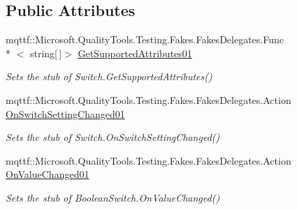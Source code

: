 \subsection*{Public Attributes}
\begin{DoxyCompactItemize}
\item 
mqttf\-::\-Microsoft.\-Quality\-Tools.\-Testing.\-Fakes.\-Fakes\-Delegates.\-Func\\*
$<$ string\mbox{[}$\,$\mbox{]}$>$ \hyperlink{class_system_1_1_diagnostics_1_1_fakes_1_1_stub_boolean_switch_a366e00de589c7eb21b99a2d8ec1f78e2}{Get\-Supported\-Attributes01}
\begin{DoxyCompactList}\small\item\em Sets the stub of Switch.\-Get\-Supported\-Attributes()\end{DoxyCompactList}\item 
mqttf\-::\-Microsoft.\-Quality\-Tools.\-Testing.\-Fakes.\-Fakes\-Delegates.\-Action \hyperlink{class_system_1_1_diagnostics_1_1_fakes_1_1_stub_boolean_switch_a458bb50dd8bf0336d5cc6a363cf26b2a}{On\-Switch\-Setting\-Changed01}
\begin{DoxyCompactList}\small\item\em Sets the stub of Switch.\-On\-Switch\-Setting\-Changed()\end{DoxyCompactList}\item 
mqttf\-::\-Microsoft.\-Quality\-Tools.\-Testing.\-Fakes.\-Fakes\-Delegates.\-Action \hyperlink{class_system_1_1_diagnostics_1_1_fakes_1_1_stub_boolean_switch_a3d0e20d86c4268ce0e7f2146151fc3cc}{On\-Value\-Changed01}
\begin{DoxyCompactList}\small\item\em Sets the stub of Boolean\-Switch.\-On\-Value\-Changed()\end{DoxyCompactList}\end{DoxyCompactItemize}
